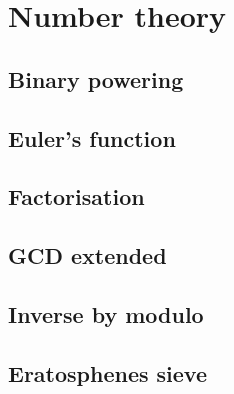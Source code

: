 \documentclass[12pt,a4paper]{article}
\begin{document}
\section{Number theory} 

\subsection{Binary powering}



\subsection{Euler's function}



\subsection{Factorisation}



\subsection{GCD extended}



\subsection{Inverse by modulo}




\subsection{Eratosphenes sieve}


\end{document}
